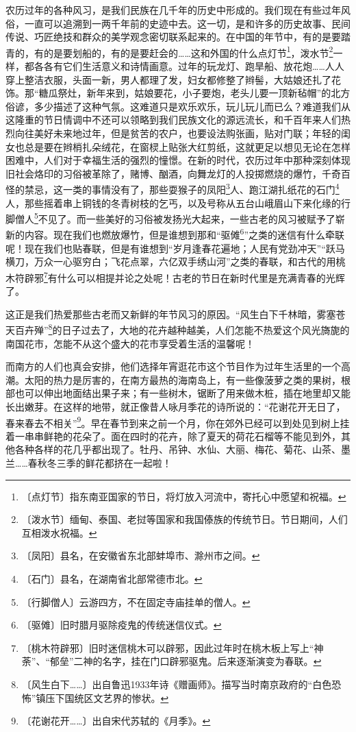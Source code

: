 \documentclass[12pt,UTF-8,openany]{ctexbook}
\begin{document}
\begin{large}
    农历过年的各种风习，是我们民族在几千年的历史中形成的。我们现在有些过年风俗，一直可以追溯到一两千年前的史迹中去。这一切，是和许多的历史故事、民间传说、巧匠绝技和群众的美学观念密切联系起来的。在中国的年节中，有的是要踏青的，有的是要划船的，有的是要赶会的……这和外国的什么点灯节\footnote{〔点灯节〕指东南亚国家的节日，将灯放入河流中，寄托心中愿望和祝福。}，泼水节\footnote{〔泼水节〕缅甸、泰国、老挝等国家和我国傣族的传统节日。节日期间，人们互相泼水祝福。}一样，都各各有它们生活意义和诗情画意。过年的玩龙灯、跑旱船、放花炮……人人穿上整洁衣服，头面一新，男人都理了发，妇女都修整了辫髻，大姑娘还扎了花饰。那“糖瓜祭灶，新年来到，姑娘要花，小子要炮，老头儿要一顶新毡帽”的北方俗谚，多少描述了这种气氛。这难道只是欢乐欢乐，玩儿玩儿而已么？难道我们从这隆重的节日情调中不还可以领略到我们民族文化的源远流长，和千百年来人们热烈向往美好未来地过年，但是贫苦的农户，也要设法购张画，贴对门联；年轻的闺女也总是要在辫梢扎朵绒花，在窗棂上贴张大红剪纸，这就更足以想见无论在怎样困难中，人们对于幸福生活的强烈的憧憬。在新的时代，农历过年中那种深刻体现旧社会烙印的习俗被革除了，赌博、酗酒，向舞龙灯的人投掷燃烧的爆竹，千奇百怪的禁忌，这一类的事情没有了，那些耍猴子的凤阳\footnote{〔凤阳〕县名，在安徽省东北部蚌埠市、滁州市之间。}人、跑江湖扎纸花的石门\footnote{〔石门〕县名，在湖南省北部常德市北。}人，那些摇着串上铜钱的冬青树枝的乞丐，以及号称从五台山峨眉山下来化缘的行脚僧人\footnote{〔行脚僧人〕云游四方，不在固定寺庙挂单的僧人。}不见了。而一些美好的习俗被发扬光大起来，一些古老的风习被赋予了崭新的内容。现在我们也燃放爆竹，但是谁想到那和“驱傩\footnote{〔驱傩〕旧时腊月驱除疫鬼的传统迷信仪式。}”之类的迷信有什么牵联呢！现在我们也贴春联，但是有谁想到“岁月逢春花遍地；人民有党劲冲天”“跃马横刀，万众一心驱穷白；飞花点翠，六亿双手绣山河”之类的春联，和古代的用桃木符辟邪\footnote{〔桃木符辟邪〕旧时迷信桃木可以辟邪，因此过年时在桃木板上写上“神荼”、“郁垒”二神的名字，挂在门口辟邪驱鬼。后来逐渐演变为春联。}有什么可以相提并论之处呢！古老的节日在新时代里是充满青春的光辉了。
    
    这正是我们热爱那些古老而又新鲜的年节风习的原因。“风生白下千林暗，雾塞苍天百卉殚”\footnote{〔风生白下……〕出自鲁迅1933年诗《赠画师》。描写当时南京政府的“白色恐怖”镇压下国统区文艺界的惨状。}的日子过去了，大地的花卉越种越美，人们怎能不热爱这个风光旖旎的南国花市，怎能不从这个盛大的花市享受着生活的温馨呢！
    
    而南方的人们也真会安排，他们选择年宵逛花市这个节目作为过年生活里的一个高潮。太阳的热力是厉害的，在南方最热的海南岛上，有一些像菠萝之类的果树，根部也可以伸出地面结出果子来；有一些树木，锯断了用来做木桩，插在地里却又能长出嫩芽。在这样的地带，就正像昔人咏月季花的诗所说的：“花谢花开无日了，春来春去不相关”\footnote{〔花谢花开……〕出自宋代苏轼的《月季》。}。早在春节到来之前一个月，你在郊外已经可以到处见到树上挂着一串串鲜艳的花朵了。面在四时的花卉，除了夏天的荷花石榴等不能见到外，其他各种各样的花几乎都出现了。牡丹、吊钟、水仙、大丽、梅花、菊花、山茶、墨兰……春秋冬三季的鲜花都挤在一起啦！
    

\end{large}
\end{document}
